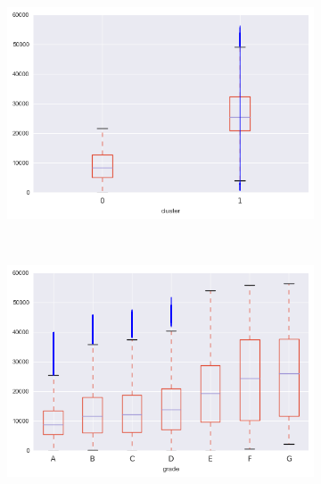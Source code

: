 \begin{apendicesenv}
\begin{figure}[t!]
\begin{subfigure}[t]{0.5\textwidth}
			\centerline{\includegraphics[width=1\textwidth]{img/total_pymnt_inv_by_cluster}}
    	\end{subfigure}%
    	~ 
    	\begin{subfigure}[t]{0.5\textwidth}
    		\centering
   
			\centerline{\includegraphics[width=1\textwidth]{img/total_pymnt_inv_by_grade}}

    	\end{subfigure}
    	\\
    	        \caption{last\textunderscore pymnt\textunderscore amnt}
    	\begin{subfigure}[t]{0.5\textwidth}
    		\centering


\end{subfigure}
\end{figure}
\end{apendicesenv}
